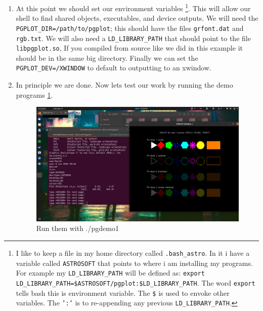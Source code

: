 \documentclass{article}
\begin{document}
\begin{enumerate}
\begin{enumerate}
    			
    			\item At this point we should set our environment variables 
    			\footnote{I like to keep a file in my home directory called \texttt{.bash\_astro}. In it i have a variable called \texttt{ASTROSOFT} that points to where i am installing my programs. For example my \texttt{LD\_LIBRARY\_PATH} will be defined as: \texttt{export LD\_LIBRARY\_PATH=\$ASTROSOFT/pgplot:\$LD\_LIBRARY\_PATH}. The word \texttt{export} tells bash this is environment variable. The \texttt{\$} is used to envoke other variables. The \texttt{':'} is to re-appending any previous \texttt{LD\_LIBRARY\_PATH}.}. 
    			This will allow our shell to find shared objects, executables, and device outputs. We will need the \texttt{PGPLOT\_DIR=/path/to/pgplot}; this should have the files \texttt{grfont.dat} and \texttt{rgb.txt}. We will also need a \texttt{LD\_LIBRARY\_PATH} that should point to the file \texttt{libpgplot.so}, If you compiled from source like we did in this example it should be in the same big directory. Finally we can set the \texttt{PGPLOT\_DEV=/XWINDOW} to default to outputting to an xwindow. 
    			
    			\item In principle we are done. Now lets test our work by running the demo programs \ref{fig:sucesfful-pgplot-install}.  
    			\begin{figure}[h]
    				\includegraphics[width=\linewidth]{Images/sucesfful-pgplot-install.png}
    				\caption{Run them with ./pgdemo1}
    				\label{fig:sucesfful-pgplot-install}  			
    			\end{figure}    	
    		\end{enumerate}   		
    	\end{enumerate}
    	
\end{document}
